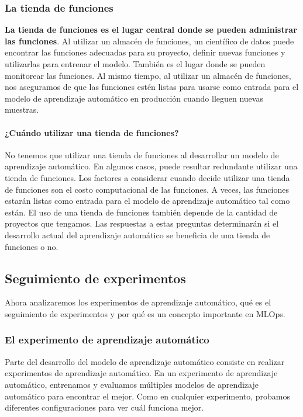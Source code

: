 \documentclass[10pt]{book}
\begin{document}
\subsubsection{La tienda de funciones}
\textbf{La tienda de funciones es el lugar central donde se pueden administrar las funciones}. Al utilizar un almacén de funciones, un científico de datos puede encontrar las funciones adecuadas para su proyecto, definir nuevas funciones y utilizarlas para entrenar el modelo. También es el lugar donde se pueden monitorear las funciones. Al mismo tiempo, al utilizar un almacén de funciones, nos aseguramos de que las funciones estén listas para usarse como entrada para el modelo de aprendizaje automático en producción cuando lleguen nuevas muestras.

\paragraph{¿Cuándo utilizar una tienda de funciones?}
No tenemos que utilizar una tienda de funciones al desarrollar un modelo de aprendizaje automático. En algunos casos, puede resultar redundante utilizar una tienda de funciones. Los factores a considerar cuando decide utilizar una tienda de funciones son el costo computacional de las funciones. A veces, las funciones estarán listas como entrada para el modelo de aprendizaje automático tal como están. El uso de una tienda de funciones también depende de la cantidad de proyectos que tengamos. Las respuestas a estas preguntas determinarán si el desarrollo actual del aprendizaje automático se beneficia de una tienda de funciones o no.


\subsection{Seguimiento de experimentos}

Ahora analizaremos los experimentos de aprendizaje automático, qué es el seguimiento de experimentos y por qué es un concepto importante en MLOps.

\subsubsection{El experimento de aprendizaje automático}
Parte del desarrollo del modelo de aprendizaje automático consiste en realizar experimentos de aprendizaje automático. En un experimento de aprendizaje automático, entrenamos y evaluamos múltiples modelos de aprendizaje automático para encontrar el mejor. Como en cualquier experimento, probamos diferentes configuraciones para ver cuál funciona mejor.
\end{document}
